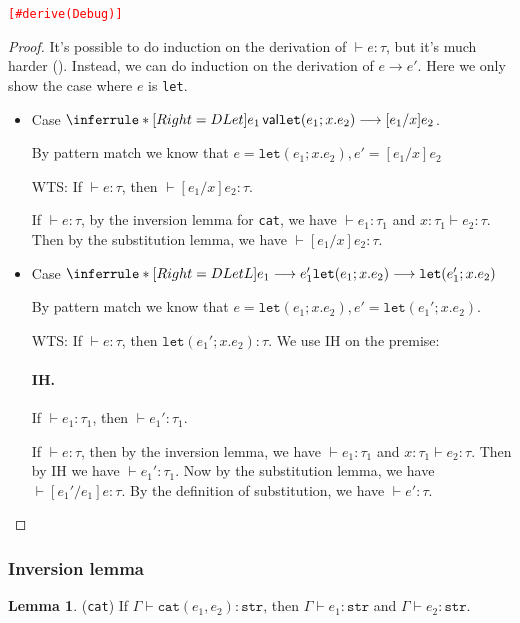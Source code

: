 \documentclass{article}
\theoremstyle{definition}
\newtheorem{lemma}{Lemma}[section]
\begin{document}
\noindent\textcolor{red}{\texttt{[\#derive(Debug)]}}
\begin{proof}
    It's possible to do induction on the derivation of $\vdash e:\tau$, but it's much harder (\cite{int}). Instead, we can do induction on the derivation of $e\longrightarrow e'$. Here we only show the case where $e$ is \texttt{let}.

    \begin{itemize}
        \item Case $\inferrule*[Right=DLet]{e_1\, \mathsf{val}}{\mathtt{let}(e_1;x.e_2) \longrightarrow [e_1/x]e_2}$.

              By pattern match we know that $e = \mathtt{let}(e_1;x.e_2), e' = [e_1/x]e_2$

              WTS: If $\vdash e:\tau$, then $\vdash [e_1/x]e_2: \tau$.

              If $\vdash e:\tau$, by the inversion lemma for \texttt{cat}, we have $\vdash e_1:\tau_1$ and $x:\tau_1 \vdash e_2:\tau$. Then by the substitution lemma, we have $\vdash [e_1/x]e_2: \tau$.
        \item \color{red}
              Case $\inferrule*[Right=DLetL]{e_1\longrightarrow e_1'}{\mathtt{let}(e_1;x.e_2) \longrightarrow \mathtt{let}(e_1';x.e_2)}$

              By pattern match we know that $e= \mathtt{let}(e_1;x.e_2), e' = \mathtt{let}(e_1';x.e_2)$.

              WTS: If $\vdash e:\tau$, then $\mathtt{let}(e_1';x.e_2): \tau$.
              We use IH on the premise:
              \paragraph*{IH.} If $\vdash e_1:\tau_1$, then $\vdash e_1':\tau_1$.

              If $\vdash e:\tau$, then by the inversion lemma, we have $\vdash e_1:\tau_1$ and $x:\tau_1 \vdash e_2:\tau$. Then by IH we have $\vdash e_1':\tau_1$.
              Now by the substitution lemma, we have $\vdash [e_1'/e_1]e:\tau$. By the definition of substitution, we have $\vdash e': \tau$.

              \color{black}
    \end{itemize}
\end{proof}

\subsubsection*{Inversion lemma}
\begin{lemma}
    (\texttt{cat}) If $\Gamma\vdash \mathtt{cat}(e_1,e_2):\mathtt{str}$, then $\Gamma \vdash e_1:\mathtt{str}$ and $\Gamma\vdash e_2:\mathtt{str}$.
\end{lemma}
\end{document}
